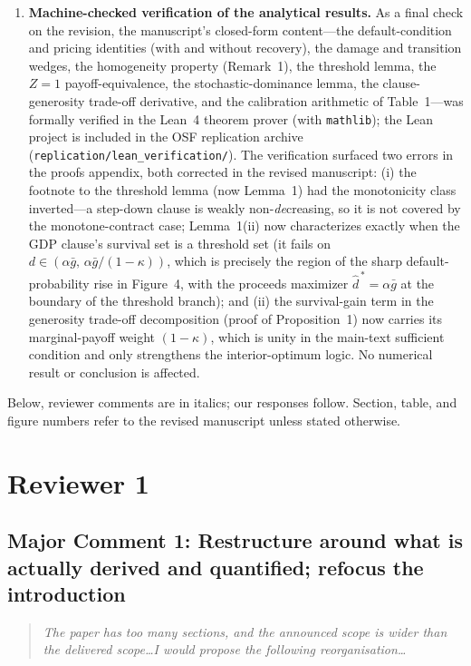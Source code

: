 \documentclass[11pt]{article}
\newcounter{comment}
\newenvironment{revcomment}%
{\refstepcounter{comment}\par\medskip\noindent\begin{quote}\itshape\color{black!70}}%
{\end{quote}\medskip}
\begin{document}
\begin{enumerate}
\item \textbf{Machine-checked verification of the analytical results.} As a final check on the revision, the manuscript's closed-form content---the default-condition and pricing identities (with and without recovery), the damage and transition wedges, the homogeneity property (Remark~1), the threshold lemma, the $Z=1$ payoff-equivalence, the stochastic-dominance lemma, the clause-generosity trade-off derivative, and the calibration arithmetic of Table~1---was formally verified in the Lean~4 theorem prover (with \texttt{mathlib}); the Lean project is included in the OSF replication archive (\texttt{replication/lean\_verification/}). The verification surfaced two errors in the proofs appendix, both corrected in the revised manuscript: (i) the footnote to the threshold lemma (now Lemma~1) had the monotonicity class inverted---a step-down clause is weakly non-\emph{de}creasing, so it is not covered by the monotone-contract case; Lemma~1(ii) now characterizes exactly when the GDP clause's survival set is a threshold set (it fails on $d\in(\alpha\bar g,\,\alpha\bar g/(1-\kappa))$, which is precisely the region of the sharp default-probability rise in Figure~4, with the proceeds maximizer $\widehat d^{\,*}=\alpha\bar g$ at the boundary of the threshold branch); and (ii) the survival-gain term in the generosity trade-off decomposition (proof of Proposition~1) now carries its marginal-payoff weight $(1-\kappa)$, which is unity in the main-text sufficient condition and only strengthens the interior-optimum logic. No numerical result or conclusion is affected.
\end{enumerate}

Below, reviewer comments are in italics; our responses follow. Section, table, and figure numbers refer to the revised manuscript unless stated otherwise.

\section*{Reviewer 1}

\subsection*{Major Comment 1: Restructure around what is actually derived and quantified; refocus the introduction}

\begin{revcomment}
The paper has too many sections, and the announced scope is wider than the delivered scope\ldots I would propose the following reorganisation\ldots
\end{revcomment}
\end{document}
